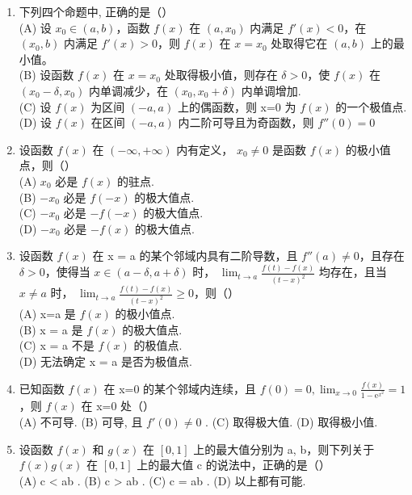 \documentclass[12pt, a4paper]{ctexart}
\begin{document}
\begin{enumerate}
    \item 下列四个命题中, 正确的是（）\\
    (A) 设 $ x_0 \in (a, b) $，函数 $ f(x) $ 在 $ (a, x_0) $ 内满足 $ f'(x) < 0 $，在 $ (x_0, b) $ 内满足 $ f'(x) > 0 $，则 $ f(x) $ 在 $ x = x_0 $ 处取得它在 $ (a, b) $ 上的最小值。\\
    (B) 设函数 $ f(x) $ 在 $ x = x_{0} $ 处取得极小值，则存在 $ \delta > 0 $，使 $ f(x) $ 在 $ (x_{0} - \delta, x_{0}) $ 内单调减少，在 $ (x_{0}, x_{0} + \delta) $ 内单调增加.\\
    (C) 设 $ f(x) $ 为区间 $ (-a, a) $ 上的偶函数，则 x=0 为 $ f(x) $ 的一个极值点.\\
    (D) 设 $ f(x) $ 在区间 $ (-a, a) $ 内二阶可导且为奇函数，则 $ f''(0) = 0 $

    \item 设函数 $ f(x) $ 在 $ (-\infty, +\infty) $ 内有定义， $ x_{0} \neq 0 $ 是函数 $ f(x) $ 的极小值点，则（）\\
    (A) $ x_{0} $ 必是 $ f(x) $ 的驻点.\\
    (B) $ -x_{0} $ 必是 $ f(-x) $ 的极大值点.\\
    (C) $ -x_{0} $ 必是 $ -f(-x) $ 的极大值点.\\
    (D) $ -x_{0} $ 必是 $ -f(x) $ 的极大值点.

    \item 设函数 $ f(x) $ 在 x = a 的某个邻域内具有二阶导数，且 $ f''(a) \neq 0 $，且存在 $ \delta > 0 $，使得当 $ x \in (a - \delta, a + \delta) $ 时， $ \lim_{t \to a} \frac{f(t) - f(x)}{(t - x)^2} $ 均存在，且当 $ x \neq a $ 时， $ \lim_{t \to a} \frac{f(t) - f(x)}{(t - x)^2} \geq 0 $，则（）\\
    (A) x=a 是 $ f(x) $ 的极小值点.\\
    (B) x = a 是 $ f(x) $ 的极大值点.\\
    (C) x = a 不是 $ f(x) $ 的极值点.\\
    (D) 无法确定 x = a 是否为极值点.

    \item 已知函数 $ f(x) $ 在 x=0 的某个邻域内连续，且 $ f(0)=0,\lim_{x\to0}\frac{f(x)}{1-\mathrm{e}^{x^2}}=1 $ ，则 $ f(x) $ 在 x=0 处（）\\
    (A) 不可导. (B) 可导, 且 $ f'(0) \neq 0 $ . (C) 取得极大值. (D) 取得极小值.

    \item 设函数 $ f(x) $ 和 $ g(x) $ 在 $ [0,1] $ 上的最大值分别为 a, b，则下列关于 $ f(x)g(x) $ 在 $ [0,1] $ 上的最大值 c 的说法中，正确的是（）\\
    (A) c < ab . (B) c > ab . (C) c = ab . (D) 以上都有可能.


\end{enumerate}
\end{document}
